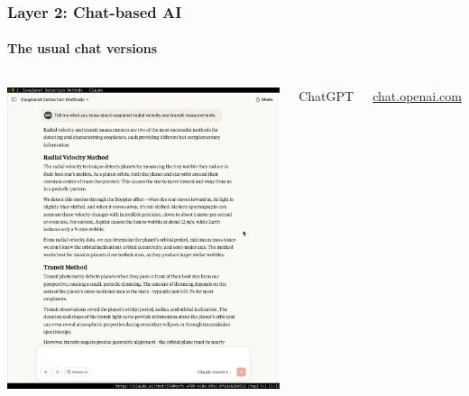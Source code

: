 \documentclass[aspectratio=169]{beamer}
\begin{document}
\begin{frame}
    \frametitle{Layer 2: Chat-based AI}
    \framesubtitle{The usual chat versions}
    
    \begin{columns}
        \centering
        \includegraphics[width=\textwidth]{figures/chatgpt_screenshot.png}
        
        ChatGPT
        
        \url{chat.openai.com}
        

\end{columns}
\end{frame}
\end{document}
